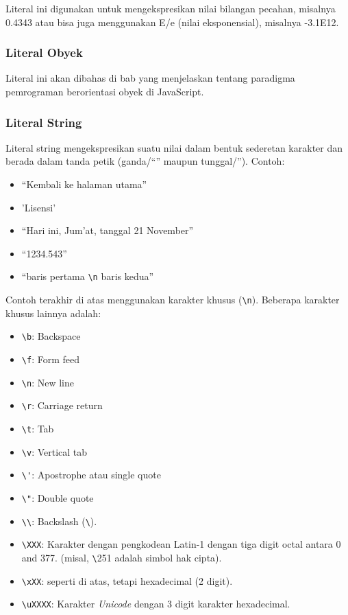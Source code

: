 Literal ini digunakan untuk mengekspresikan nilai bilangan pecahan, misalnya 0.4343 atau bisa juga menggunakan E/e (nilai eksponensial), misalnya 
-3.1E12.

\subsubsection{Literal Obyek}

Literal ini akan dibahas di bab yang menjelaskan tentang paradigma pemrograman berorientasi obyek di JavaScript.

\subsubsection{Literal String}

Literal string mengekspresikan suatu nilai dalam bentuk sederetan karakter dan berada dalam tanda petik (ganda/``'' maupun tunggal/''). Contoh:
\begin{itemize}
   \item ``Kembali ke halaman utama''
   \item 'Lisensi'
   \item ``Hari ini, Jum'at, tanggal 21 November''
   \item ``1234.543''
   \item ``baris pertama \verb+\n+ baris kedua''
 \end{itemize}

Contoh terakhir di atas menggunakan karakter khusus (\verb+\n+). Beberapa karakter khusus lainnya adalah:

\begin{itemize}
  \item \verb+\b+: Backspace
  \item \verb+\f+: Form feed
  \item \verb+\n+: New line
  \item \verb+\r+: Carriage return
  \item \verb+\t+: Tab
  \item \verb+\v+: Vertical tab
  \item \verb+\'+: Apostrophe atau single quote
  \item \verb+\"+: Double quote
  \item \verb+\\+:	Backslash (\verb+\+).
  \item \verb+\XXX+: Karakter dengan pengkodean Latin-1 dengan tiga digit octal antara 0 and 377. (misal, \verb+\+251 adalah simbol hak cipta).
  \item \verb+\xXX+: seperti di atas, tetapi hexadecimal (2 digit).
  \item \verb+\uXXXX+: Karakter \textit{Unicode} dengan 3 digit karakter hexadecimal.
\end{itemize}

